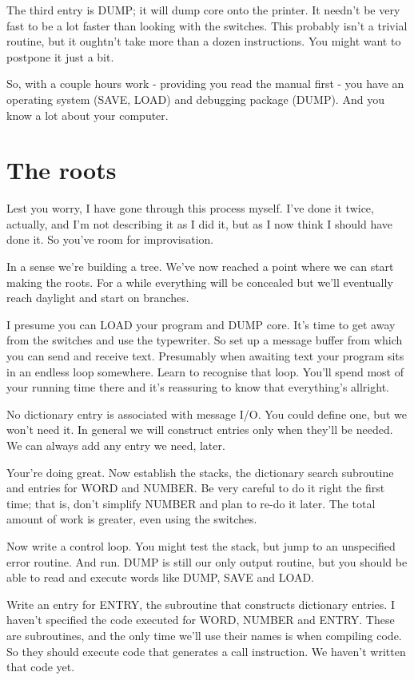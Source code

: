 \documentclass[b5paper, oneside]{book}
\begin{document}
The third entry is DUMP; it will dump core onto the printer. It needn't be very fast to be a lot faster than looking with the switches. This probably isn't a trivial routine, but it oughtn't take more than a dozen instructions. You might want to postpone it just a bit.

So, with a couple hours work - providing you read the manual first - you have an operating system (SAVE, LOAD) and debugging package (DUMP). And you know a lot about your computer.

\section{The roots}
Lest you worry, I have gone through this process myself. I've done it twice, actually, and I'm not describing it as I did it, but as I now think I should have done it. So you've room for improvisation.

In a sense we're building a tree. We've now reached a point where we can start making the roots. For a while everything will be concealed but we'll eventually reach daylight and start on branches.

I presume you can LOAD your program and DUMP core. It's time to get away from the switches and use the typewriter. So set up a message buffer from which you can send and receive text. Presumably when awaiting text your program sits in an endless loop somewhere. Learn to recognise that loop. You'll spend most of your running time there and it's reassuring to know that everything's allright.

No dictionary entry is associated with message I/O. You could define one, but we won't need it. In general we will construct entries only when they'll be needed. We can always add any entry we need, later.

Your're doing great. Now establish the stacks, the dictionary search subroutine and entries for WORD and NUMBER. Be very careful to do it right the first time; that is, don't simplify NUMBER and plan to re-do it later. The total amount of work is greater, even using the switches.

Now write a control loop. You might test the stack, but jump to an unspecified error routine. And run. DUMP is still our only output routine, but you should be able to read and execute words like DUMP, SAVE and LOAD.

Write an entry for ENTRY, the subroutine that constructs dictionary entries. I haven't specified the code executed for WORD, NUMBER and ENTRY. These are subroutines, and the only time we'll use their names is when compiling code. So they should execute code that generates a call instruction. We haven't written that code yet.
\end{document}
